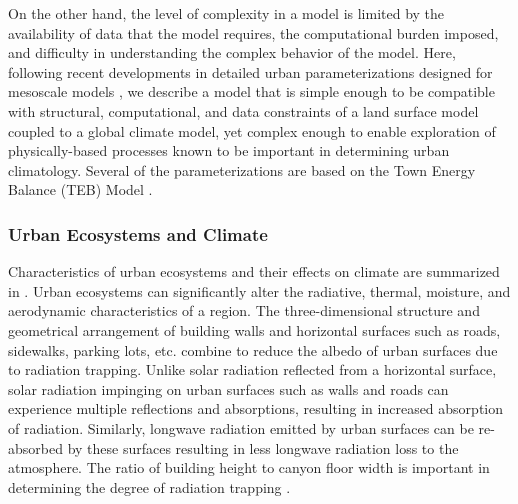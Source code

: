 \documentclass[12pt,authoryear]{elsarticle}
\numberwithin{equation}{section} %
\begin{document}
On the other hand, the level of complexity in a model is limited by the availability of data that the model requires, the computational burden imposed, and difficulty in understanding the complex behavior of the model. Here, following recent developments in detailed urban parameterizations designed for mesoscale models \cite{massonPhysicallyBasedSchemeUrban2000,martilliUrbanSurfaceExchange2002,grimmondTurbulentHeatFluxes2002,kusakaThermalEffectsUrban2004,otteImplementationUrbanCanopy2004,dandouDevelopmentEvaluationUrban2005}, we describe a model that is simple enough to be compatible with structural, computational, and data constraints of a land surface model coupled to a global climate model, yet complex enough to enable exploration of physically-based processes known to be important in determining urban climatology. Several of the parameterizations are based on the Town Energy Balance (TEB) Model \citep{massonPhysicallyBasedSchemeUrban2000,massonEvaluationTownEnergy2002,lemonsuModelingSurfaceEnergy2004}.

\subsubsection{Urban Ecosystems and Climate}
Characteristics of urban ecosystems and their effects on climate are summarized in \citet{landsbergUrbanClimate1981,okeBoundaryLayerClimates1987,bonanEcologicalClimatologyConcepts2002,arnfieldTwoDecadesUrban2002}. Urban ecosystems can significantly alter the radiative, thermal, moisture, and aerodynamic characteristics of a region. The three-dimensional structure and geometrical arrangement of building walls and horizontal surfaces such as roads, sidewalks, parking lots, etc. combine to reduce the albedo of urban surfaces due to radiation trapping. Unlike solar radiation reflected from a horizontal surface, solar radiation impinging on urban surfaces such as walls and roads
can experience multiple reflections and absorptions, resulting in increased absorption of radiation. Similarly, longwave radiation emitted by urban surfaces can be re-absorbed by these surfaces resulting in less longwave radiation loss to the atmosphere. The ratio of building height to canyon floor width is important in determining the degree of radiation trapping \citep{okeCanyonGeometryNocturnal1981,okeSimulationSurfaceUrban1991}.
\end{document}
